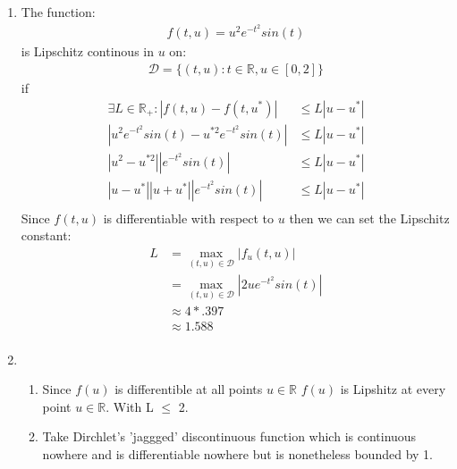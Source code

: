 \documentclass{article}
\begin{document}

\begin{enumerate}

\item 
The function:
\begin{equation*}
\begin{split}
f(t,u) = u^{2}e^{-t^{2}}sin(t)
\end{split}
\end{equation*}
is Lipschitz continous in $u$ on:
\begin{equation*}
\begin{split}
 \mathcal{D} =\{(t,u): t\in \mathbb{R}, u \in [0,2]\}
\end{split}
\end{equation*}
if 
\begin{equation*}
\begin{split}
\exists L \in \mathbb{R_{+}} : \left|f(t,u) -f(t,u^{*}) \right| & \leq L \left| u - u^{*} \right| \\
\left|  u^{2}e^{-t^{2}}sin(t) - u^{*2}e^{-t^{2}}sin(t)  \right|  &\leq L \left| u - u^{*} \right| \\
\left|  u^{2}- u^{*2}  \right| \left|e^{-t^{2}}sin(t)\right|  &\leq L \left| u - u^{*} \right| \\
\left|  u- u^{*}  \right| \left|u+u^{*}\right| \left|e^{-t^{2}}sin(t)\right|  &\leq L \left| u - u^{*} \right| \\
\end{split}
\end{equation*}
Since $f(t,u)$ is differentiable with respect to $u$ then we can set the Lipschitz constant:
\begin{equation*}
\begin{split}
L &= \max_{(t,u) \in \mathcal{D}} \left| f_{u}(t,u) \right| \\
& =  \max_{(t,u) \in \mathcal{D}} \left| 2ue^{-t^{2}}sin(t) \right| \\
&\approx 4*.397 \\
& \approx 1.588 \\
\end{split}
\end{equation*}
\item
\begin{enumerate}
\item
Since $f(u)$ is differentible at all points $u \in \mathbb{R}$ $f(u)$ is Lipshitz at every point $u \in \mathbb{R}$.
With L $\leq$ 2.
\item
Take Dirchlet's 'jaggged' discontinuous function which is continuous nowhere and is differentiable nowhere but is nonetheless bounded by 1.
\end{enumerate}
\end{enumerate}
\end{document}
